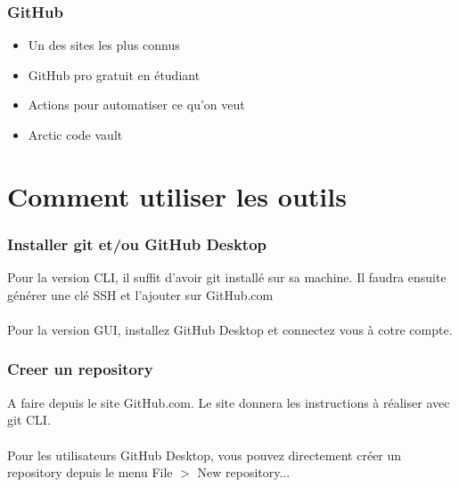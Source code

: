 \documentclass{beamer}
\begin{document}

\begin{frame}\frametitle{GitHub}
\begin{itemize}
    \item Un des sites les plus connus
    \item GitHub pro gratuit en étudiant
    \item Actions pour automatiser ce qu'on veut
    \item Arctic code vault
\end{itemize}
\end{frame}


\section{Comment utiliser les outils} %

\begin{frame}\frametitle{Installer git et/ou GitHub Desktop}
    Pour la version CLI, il suffit d'avoir git installé sur sa machine. Il faudra ensuite générer une clé SSH et l'ajouter sur GitHub.com \\~\\

    Pour la version GUI, installez GitHub Desktop et connectez vous à cotre compte. 
\end{frame}


\begin{frame}\frametitle{Creer un repository}
    A faire depuis le site GitHub.com. Le site donnera les instructions à réaliser avec git CLI. \\~\\

    Pour les utilisateurs GitHub Desktop, vous pouvez directement créer un repository depuis le menu File $>$ New repository... 
\end{frame}

\end{document}
